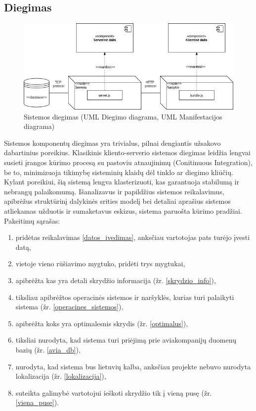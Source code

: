 \documentclass{VUMIFPSkursinis}
\begin{document}
      \subsection{Diegimas}
        \begin{figure}[H]
          \centering
          \includegraphics[scale=0.7]{img/Diegimas}
          \caption{Sistemos diegimas (UML Diegimo diagrama, UML Manifestacijos diagrama)}
          \label{deployment}
        \end{figure}
        Sistemos komponentų diegimas yra trivialus, pilnai dengiantis užsakovo dabartinius poreikius. Klasikinis kliento-serverio sistemos diegimas leidžia lengvai susieti įrangos kūrimo procesą su pastoviu atnaujinimų (Conitinuous Integration), be to, minimizuoja tikimybę sisteminių klaidų dėl tinklo ar diegimo kliūčių. Kylant poreikiui, šią sistemą lengva klasterizuoti, kas garantuoja stabilumą ir nebrangų palaikomumą.
			Išanalizavus ir papildžius sistemos reikalavimus, apibrėžus struktūrinį dalykinės srities modelį bei detaliai aprašius sistemos atliekamas užduotis ir sumaketavus eskizus, sistema paruošta kūrimo pradžiai.
			Pakeitimų sąrašas:
			\begin{enumerate}
				\item pridėtas reikalavimas \ref{datos_ivedimas}, anksčiau vartotojas pats turėjo įvesti datą,
				\item vietoje vieno rūšiavimo mygtuko, pridėti trys mygtukai,
				\item apibrėžta kas yra detali skrydžio informacija (žr. \ref{skrydzio_info}),
				\item tiksliau apibrėžtos operacinės sistemos ir naršyklės, kurias turi palaikyti sistema (žr. \ref{operacines_sistemos}),
				\item apibrėžta koks yra optimalesnis skrydis (žr. \ref{optimalus}),
				\item tiksliai nurodyta, kad sistema turi priėjimą prie aviakompanijų duomenų bazių (žr. \ref{avia_db}),
				\item nurodyta, kad sistema bus lietuvių kalba, anksčiau projekte nebuvo nurodyta lokalizacija (žr. \ref{lokalizacija}),
				\item suteikta galimybė vartotojui ieškoti skrydžio tik į vieną pusę (žr. \ref{viena_puse}).
			\end{enumerate}
\end{document}
